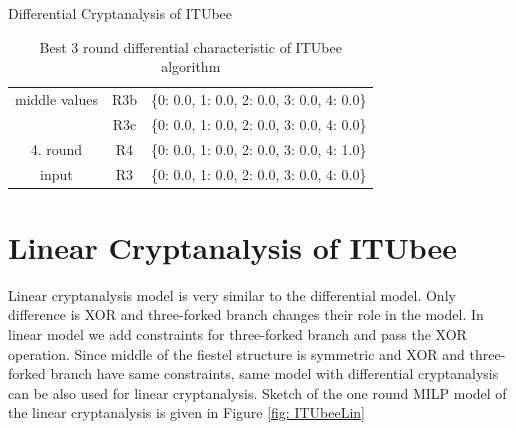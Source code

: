 \documentclass [version=final]{iacrcc}
\begin{document}
\begin{section}{Differential Cryptanalysis of ITUbee}
\begin{table}[H]
\begin{tabular}{|c|c|c|}
        middle values   & R3b & \{0: 0.0, 1: 0.0, 2: 0.0, 3: 0.0, 4: 0.0\} \\
                   & R3c & \{0: 0.0, 1: 0.0, 2: 0.0, 3: 0.0, 4: 0.0\} \\
        \hline
        4. round & R4 & \{0: 0.0, 1: 0.0, 2: 0.0, 3: 0.0, 4: 1.0\} \\
        input    & R3 & \{0: 0.0, 1: 0.0, 2: 0.0, 3: 0.0, 4: 0.0\} \\
        \hline
    \end{tabular}
    \caption{Best 3 round differential characteristic of ITUbee algorithm}
    \label{tab:MILPcharDif}
\end{table}

\end{section}
\section{Linear Cryptanalysis of ITUbee}

Linear cryptanalysis model is very similar to the differential model. Only difference is XOR and three-forked branch changes their role in the model. In linear model we add constraints for three-forked branch and pass the XOR operation. Since middle of the fiestel structure is symmetric and XOR and three-forked branch have same constraints, same model with differential cryptanalysis can be also used for linear cryptanalysis. Sketch of the one round MILP model of the linear cryptanalysis is given in Figure \ref{fig: ITUbeeLin}
\end{document}
